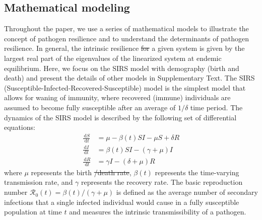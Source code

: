 \documentclass[12pt]{article}
\newcommand{\dd}[1]{\ensuremath{\, \mathrm{d}#1}}
\providecommand{\DIFaddtex}[1]{{\protect\color{blue}\uwave{#1}}} %
\providecommand{\DIFdeltex}[1]{{\protect\color{red}\sout{#1}}}                      %
\providecommand{\DIFaddbegin}{} %
\providecommand{\DIFaddend}{} %
\providecommand{\DIFdelbegin}{} %
\providecommand{\DIFdelend}{} %
\providecommand{\DIFadd}[1]{\texorpdfstring{\DIFaddtex{#1}}{#1}} %
\providecommand{\DIFdel}[1]{\texorpdfstring{\DIFdeltex{#1}}{}} %
\newcommand{\DIFscaledelfig}{0.5}
\newlength{\DIFdelgraphicswidth} %
\newlength{\DIFdelgraphicsheight} %
\newcommand{\DIFaddincludegraphics}[2][]{{\color{blue}\fbox{\DIFOincludegraphics[#1]{#2}}}} %
\newcommand{\DIFdelincludegraphics}[2][]{%
\sbox{\DIFdelgraphicsbox}{\DIFOincludegraphics[#1]{#2}}%
\settoboxwidth{\DIFdelgraphicswidth}{\DIFdelgraphicsbox} %
\settoboxtotalheight{\DIFdelgraphicsheight}{\DIFdelgraphicsbox} %
\scalebox{\DIFscaledelfig}{%
\parbox[b]{\DIFdelgraphicswidth}{\usebox{\DIFdelgraphicsbox}\\[-\baselineskip] \rule{\DIFdelgraphicswidth}{0em}}\llap{\resizebox{\DIFdelgraphicswidth}{\DIFdelgraphicsheight}{%
\setlength{\unitlength}{\DIFdelgraphicswidth}%
\begin{picture}(1,1)%
\thicklines\linethickness{2pt} %
{\color[rgb]{1,0,0}\put(0,0){\framebox(1,1){}}}%
{\color[rgb]{1,0,0}\put(0,0){\line( 1,1){1}}}%
{\color[rgb]{1,0,0}\put(0,1){\line(1,-1){1}}}%
\end{picture}%
}\hspace*{3pt}}} %
} %
\DeclareRobustCommand{\DIFaddbegin}{\DIFOaddbegin \let\includegraphics\DIFaddincludegraphics} %
\DeclareRobustCommand{\DIFaddend}{\DIFOaddend \let\includegraphics\DIFOincludegraphics} %
\DeclareRobustCommand{\DIFdelbegin}{\DIFOdelbegin \let\includegraphics\DIFdelincludegraphics} %
\DeclareRobustCommand{\DIFdelend}{\DIFOaddend \let\includegraphics\DIFOincludegraphics} %
\begin{document}
\subsection*{Mathematical modeling}

Throughout the paper, we use a series of mathematical models to illustrate the concept of pathogen resilience and to understand the determinants of pathogen resilience.
In general, the intrinsic resilience \DIFdelbegin \DIFdel{for }\DIFdelend \DIFaddbegin \DIFadd{of }\DIFaddend a given system is given by the largest real part of the eigenvalues of the linearized system at endemic equilibrium.
Here, we focus on the SIRS model with demography (birth and death) and present the details of other models in Supplementary Text.
The SIRS (Susceptible-Infected-Recovered-Susceptible) model is the simplest model that allows for waning of immunity, where recovered (immune) individuals are assumed to become fully susceptible after an average of $1/\delta$ time period.
The dynamics of the SIRS model is described by the following set of differential equations:
\begin{align}
\frac{\dd S}{\dd t} &= \mu - \beta(t) SI - \mu S + \delta R \\
\frac{\dd I}{\dd t} &= \beta(t) SI - (\gamma + \mu) I \\
\frac{\dd R}{\dd t} &= \gamma I - (\delta + \mu) R
\DIFdelbegin %
\DIFdelend \end{align}
where $\mu$ represents the birth \DIFdelbegin \DIFdel{/death rate}\DIFdelend \DIFaddbegin \DIFadd{and death rates}\DIFaddend , $\beta(t)$ represents the time-varying transmission rate, and $\gamma$ represents the recovery rate.
The basic reproduction number $\mathcal R_0(t) = \beta(t)/(\gamma + \mu)$ is defined as the average number of secondary infections that a single infected individual would cause in a fully susceptible population at time $t$ and measures the intrinsic transmissibility of a pathogen.
\end{document}
